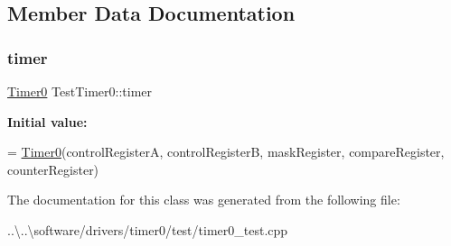 \subsection{Member Data Documentation}
\mbox{\label{class_test_timer0_a90dac1cc2a8a41c22f76fc0dd169ab67}} 
\subsubsection{\texorpdfstring{timer}{timer}}
{\footnotesize\ttfamily \mbox{\hyperlink{class_timer0}{Timer0}} Test\+Timer0\+::timer}

{\bfseries Initial value\+:}
\begin{DoxyCode}
= \mbox{\hyperlink{class_timer0}{Timer0}}(controlRegisterA, controlRegisterB, maskRegister,
        compareRegister, counterRegister)
\end{DoxyCode}


The documentation for this class was generated from the following file\+:\begin{DoxyCompactItemize}
\item 
..\textbackslash{}..\textbackslash{}software/drivers/timer0/test/timer0\+\_\+test.\+cpp\end{DoxyCompactItemize}
